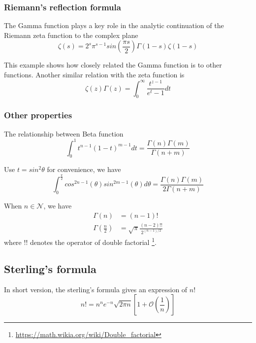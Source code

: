 \subsubsection{Riemann's reflection formula}
The Gamma function plays a key role in the analytic continuation of the Riemann zeta function to the complex plane
\begin{equation}
    \label{Equation: Riemann's reflection formula}
    \zeta (s) = 2^s \pi^{s-1} sin(\frac{\pi s}{2}) \Gamma(1-s) \zeta(1-s)
\end{equation}

This example shows how closely related the Gamma function is to other functions.
Another similar relation with the zeta function is
\begin{equation*}
    \zeta(z) \Gamma(z) = \int_{0}^{\infty}
    \frac{t^{z-1}}{e^t-1} dt
\end{equation*}

\subsubsection{Other properties}
The relationship between Beta function
\begin{equation*}
    \int_{0}^{1} t^{n-1} (1-t)^{m-1} dt =
    \frac{\Gamma(n) \Gamma(m)}{\Gamma(n+m)}
\end{equation*}

Use $t=sin^2{\theta}$ for convenience, we have
\begin{equation*}
    \int_{0}^{\frac{\pi}{2}} cos^{2n-1}(\theta) sin^{2m-1}(\theta) d\theta =
    \frac{\Gamma(n) \Gamma(m)}{2 \Gamma(n+m)}
\end{equation*}

When $n \in \mathcal{N}$, we have
\begin{align*}
    \Gamma(n)           & = (n-1)!                                 \\
    \Gamma(\frac{n}{2}) & = \sqrt{\pi} \frac{(n-2)!!}{2^{(n-1)/2}}
\end{align*}
where $!!$ denotes the operator of double factorial \footnote{\url{https://math.wikia.org/wiki/Double_factorial}}.

\subsection{Sterling's formula}
In short version, the sterling's formula gives an expression of $n!$
\begin{equation}
    \label{Equation: Sterling's formula}
    n! = n^n e^{-n} \sqrt{2 \pi n} [1 + \mathcal{O}(\frac{1}{n})]
\end{equation}

